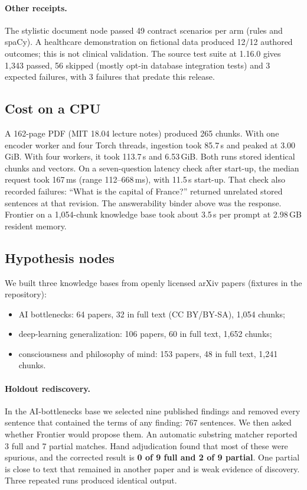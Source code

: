 \documentclass[11pt]{article}
\begin{document}
\paragraph{Other receipts.} The stylistic document node passed 49 contract scenarios per arm (rules and spaCy). A
healthcare demonstration on fictional data produced 12/12 authored outcomes; this is not clinical validation. The source test suite at 1.16.0 gives 1{,}343 passed, 56 skipped (mostly opt-in database
integration tests) and 3 expected failures, with 3 failures that predate this release.

\subsection{Cost on a CPU}

A 162-page PDF (MIT 18.04 lecture notes) produced 265 chunks. With one encoder worker and four Torch threads,
ingestion took 85.7\,s and peaked at 3.00\,GiB. With four workers, it took 113.7\,s and 6.53\,GiB. Both runs
stored identical chunks and vectors. On a seven-question latency check after start-up, the median request took
167\,ms (range 112--668\,ms), with 11.5\,s start-up. That check also recorded failures: ``What is the capital of
France?'' returned unrelated stored sentences at that revision. The answerability binder above was the
response. Frontier on a 1{,}054-chunk knowledge base took about 3.5\,s per prompt at 2.98\,GB resident memory.

\subsection{Hypothesis nodes}

We built three knowledge bases from openly licensed arXiv papers (fixtures in the repository):
\begin{itemize}
  \item AI bottlenecks: 64 papers, 32 in full text (CC BY/BY-SA), 1{,}054 chunks;
  \item deep-learning generalization: 106 papers, 60 in full text, 1{,}652 chunks;
  \item consciousness and philosophy of mind: 153 papers, 48 in full text, 1{,}241 chunks.
\end{itemize}

\paragraph{Holdout rediscovery.} In the AI-bottlenecks base we selected nine published findings and removed every
sentence that contained the terms of any finding: 767 sentences. We then asked whether Frontier would propose them.
An automatic substring matcher reported 3 full and 7 partial matches. Hand adjudication found that most of these
were spurious, and the corrected result is \textbf{0 of 9 full and 2 of 9 partial}. One partial is close to text
that remained in another paper and is weak evidence of discovery. Three repeated runs produced identical output.
\end{document}
